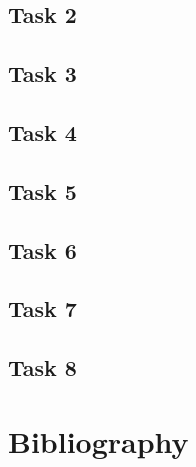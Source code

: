 \documentclass{article}
\begin{document}
\subsection{Task 2}
\subsection{Task 3}
\subsection{Task 4}
\subsection{Task 5}
\subsection{Task 6}
\subsection{Task 7}
\subsection{Task 8}
\section{Bibliography}
\end{document}
